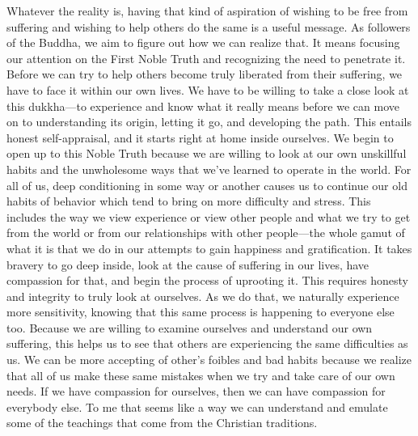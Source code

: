 Whatever the reality is, having that kind of aspiration of wishing to 
be free from suffering and wishing to help others do the same is a 
useful message. As followers of the Buddha, we aim to figure out how we 
can realize that. It means focusing our attention on the First Noble 
Truth and recognizing the need to penetrate it. Before we can try to 
help others become truly liberated from their suffering, we have to 
face it within our own lives. We have to be willing to take a close 
look at this dukkha---to experience and know what it really means 
before we can move on to understanding its origin, letting it go, and 
developing the path. This entails honest self-appraisal, and it starts 
right at home inside ourselves. We begin to open up to this Noble Truth 
because we are willing to look at our own unskillful habits and the 
unwholesome ways that we've learned to operate in the world. For all of 
us, deep conditioning in some way or another causes us to continue our 
old habits of behavior which tend to bring on more difficulty and 
stress. This includes the way we view experience or view other people 
and what we try to get from the world or from our relationships with 
other people---the whole gamut of what it is that we do in our attempts 
to gain happiness and gratification. It takes bravery to go deep 
inside, look at the cause of suffering in our lives, have compassion 
for that, and begin the process of uprooting it. This requires honesty 
and integrity to truly look at ourselves. As we do that, we naturally 
experience more sensitivity, knowing that this same process is 
happening to everyone else too. Because we are willing to examine 
ourselves and understand our own suffering, this helps us to see that 
others are experiencing the same difficulties as us. We can be more 
accepting of other's foibles and bad habits because we realize that all 
of us make these same mistakes when we try and take care of our own 
needs. If we have compassion for ourselves, then we can have compassion 
for everybody else. To me that seems like a way we can understand and 
emulate some of the teachings that come from the Christian traditions.

